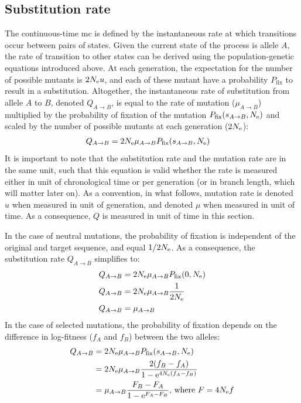 \subsection{Substitution rate}
The continuous-time \gls{mc} is defined by the instantaneous rate at which transitions occur between pairs of states.
Given the current state of the process is \gls{allele} $A$, the rate of {transition} to other states can be derived using the population-genetic equations introduced above.
At each generation, the expectation for the number of possible mutants is $2N_{\textrm{e}} u$, and each of these mutant have a probability $P_{\mathrm{fix}}$ to result in a \gls{substitution}.
Altogether, the instantaneous rate of \gls{substitution} from \gls{allele} $A$ to $B$, denoted $Q_{A \to B}$, is equal to the rate of mutation ($\mu_{A \to B}$) multiplied by the probability of fixation of the mutation $P_{\mathrm{fix}}(s_{A \to B}, N_{\textrm{e}})$ and scaled by the number of possible mutants at each generation ($2N_{\textrm{e}}$):
\begin{align}
    Q_{A \to B} & = 2 N_{\textrm{e}} \mu_{A \to B}  P_{\mathrm{fix}}(s_{A \to B}, N_{\textrm{e}})
\end{align}
It is important to note that the \gls{substitution} rate and the mutation rate are in the same unit, such that this equation is valid whether the rate is measured either in unit of chronological time or per generation (or in branch length, which will matter later on).
As a convention, in what follows, mutation rate is denoted $u$ when measured in unit of generation, and denoted $\mu$ when measured in unit of time.
As a consequence, $Q$ is measured in unit of time in this section.

In the case of \gls{neutral} mutations, the probability of fixation is independent of the original and target sequence, and equal $1/2 N_{\textrm{e}}$.
As a consequence, the \gls{substitution} rate $Q_{A \to B}$ simplifies to:
\begin{align}
    Q_{A \to B} & = 2 N_{\textrm{e}} \mu_{A \to B}  P_{\mathrm{fix}}(0, N_{\textrm{e}}) \\
    Q_{A \to B} & = 2 N_{\textrm{e}} \mu_{A \to B} \dfrac{1}{2N_{\textrm{e}}} \\
    Q_{A \to B} & =  \mu_{A \to B} \label{eq:sub-equal-mut}
\end{align}
In the case of selected mutations, the probability of fixation depends on the difference in log-fitness ($f_A$ and $f_B$) between the two \glspl{allele}:
\begin{align}
    Q_{A \to B} & = 2 N_{\textrm{e}} \mu_{A \to B} P_{\mathrm{fix}}(s_{A \to B}, N_{\textrm{e}}) \\
    & = 2 N_{\textrm{e}} \mu_{A \to B}  \dfrac{2(f_{B} - f_{A})}{1 - \mathrm{e}^{4N_{\textrm{e}}(f_{A} - f_{B})} } \\
    & = \mu_{A \to B} \dfrac{F_{B} - F_{A}}{1 - \mathrm{e}^{F_{A} - F_{B}} }\text{, where } F = 4N_{\textrm{e}} f \label{eq:sub-transion-rates}
\end{align}

